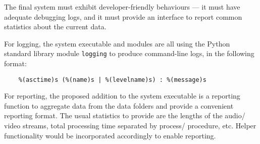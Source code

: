 The final system must exhibit developer-friendly behaviours --- it must have
adequate debugging logs, and it must provide an interface to report common
statistics about the current data.

For logging, the system executable and modules are all using the Python standard
library module \texttt{logging} to produce command-line logs, in the following
format:

\begin{lstlisting}
    %(asctime)s (%(name)s | %(levelname)s) : %(message)s
\end{lstlisting}

For reporting, the proposed addition to the system executable is a reporting
function to aggregate data from the data folders and provide a convenient reporting
format. The usual statistics to provide are the lengths of the audio/ video streams,
total processing time separated by process/ procedure, etc. Helper functionality
would be incorporated accordingly to enable reporting.
